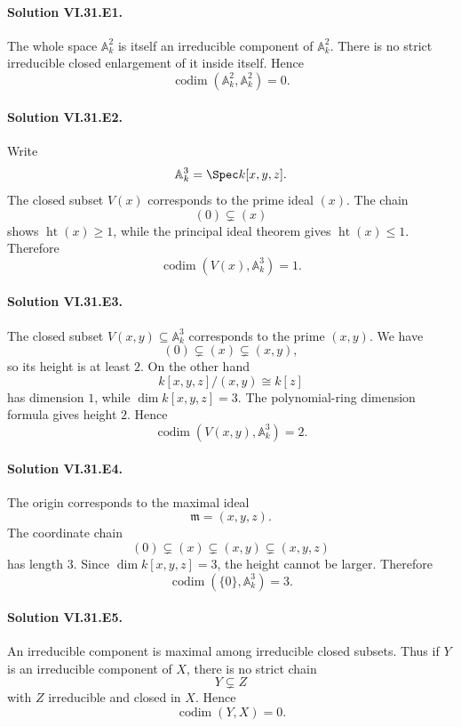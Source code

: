 
\paragraph{Solution VI.31.E1.}
The whole space \(\mathbb A^2_k\) is itself an irreducible component of \(\mathbb A^2_k\).  There is no strict
irreducible closed enlargement of it inside itself.  Hence
\[
\boxed{\operatorname{codim}(\mathbb A^2_k,\mathbb A^2_k)=0}.
\]

\paragraph{Solution VI.31.E2.}
Write
\[
\mathbb A^3_k=\Spec k[x,y,z].
\]
The closed subset \(V(x)\) corresponds to the prime ideal \((x)\).  The chain
\[
(0)\subsetneq(x)
\]
shows \(\operatorname{ht}(x)\ge1\), while the principal ideal theorem gives
\(\operatorname{ht}(x)\le1\).  Therefore
\[
\boxed{\operatorname{codim}(V(x),\mathbb A^3_k)=1}.
\]

\paragraph{Solution VI.31.E3.}
The closed subset \(V(x,y)\subseteq\mathbb A^3_k\) corresponds to the prime \((x,y)\).  We have
\[
(0)\subsetneq(x)\subsetneq(x,y),
\]
so its height is at least \(2\).  On the other hand
\[
k[x,y,z]/(x,y)\cong k[z]
\]
has dimension \(1\), while \(\dim k[x,y,z]=3\).  The polynomial-ring dimension formula gives height \(2\).  Hence
\[
\boxed{\operatorname{codim}(V(x,y),\mathbb A^3_k)=2}.
\]

\paragraph{Solution VI.31.E4.}
The origin corresponds to the maximal ideal
\[
\mathfrak m=(x,y,z).
\]
The coordinate chain
\[
(0)\subsetneq(x)\subsetneq(x,y)\subsetneq(x,y,z)
\]
has length \(3\).  Since \(\dim k[x,y,z]=3\), the height cannot be larger.  Therefore
\[
\boxed{\operatorname{codim}(\{0\},\mathbb A^3_k)=3}.
\]

\paragraph{Solution VI.31.E5.}
An irreducible component is maximal among irreducible closed subsets.  Thus if \(Y\) is an irreducible component
of \(X\), there is no strict chain
\[
Y\subsetneq Z
\]
with \(Z\) irreducible and closed in \(X\).  Hence
\[
\boxed{\operatorname{codim}(Y,X)=0}.
\]

